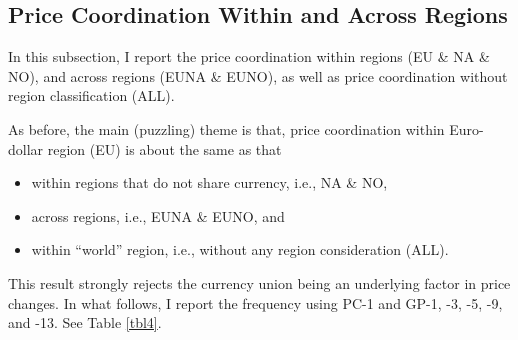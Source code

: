 \subsection{Price Coordination Within and Across Regions}

In this subsection, I report the price coordination within regions (EU \& NA \& NO), and across regions (EUNA \& EUNO), as well as price coordination without region classification (ALL).

As before, the main (puzzling) theme is that, price coordination within Euro-dollar region (EU) is about the same as that 
\begin{itemize}
	\item within regions that do not share currency, i.e., NA \& NO,
	\item across regions, i.e., EUNA \& EUNO, and
	\item within ``world'' region, i.e., without any region consideration (ALL).
\end{itemize}
This result strongly rejects the currency union being an underlying factor in price changes. In what follows, I report the frequency using PC-1 and GP-1, -3, -5, -9, and -13. See Table \ref{tbl4}.

